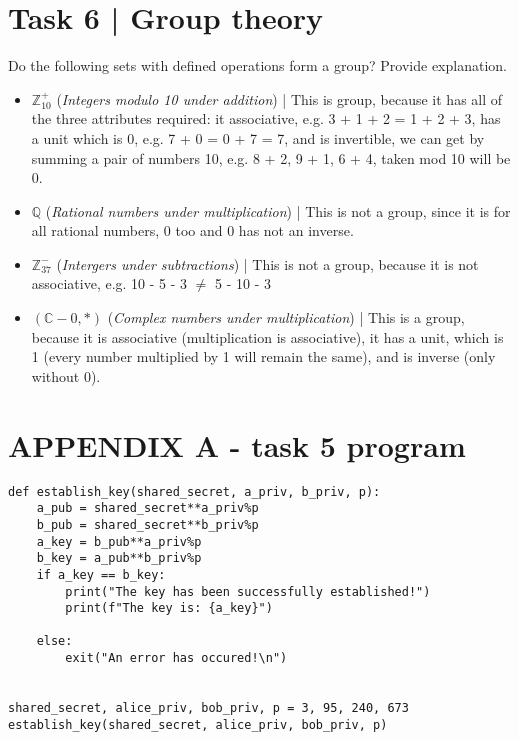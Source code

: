 \documentclass{article}
\begin{document}
\section*{Task 6 | Group theory}
Do the following sets with defined operations form a group? Provide explanation.
\begin{itemize}
    \item $\mathbb{Z}_{10}^+$ (\textit{Integers modulo 10 under addition}) | 
        This is group, because it has all of the three attributes required: it associative, 
        e.g. 3 + 1 + 2 =  1 + 2 + 3, has a unit which is 0, e.g. 7 + 0 = 0 + 7 = 7, and
        is invertible, we can get by summing a pair of numbers 10, e.g. 8 + 2, 9 + 1, 6 + 4,
        taken mod 10 will be 0.
    \item $\mathbb{Q}$ (\textit{Rational numbers under multiplication}) | This is not a group, 
        since it is for all rational numbers, 0 too and 0 has not an inverse.
    \item $\mathbb{Z}_{37}^-$ (\textit{Intergers under subtractions}) | This is not a group, because
        it is not associative, e.g. 10 - 5 - 3 $\ne$ 5 - 10 - 3
    \item $(\mathbb{C} - 0, *)$ (\textit{Complex numbers under multiplication}) | This is a group, 
        because it is associative (multiplication is associative), it has a unit, 
        which is 1 (every number multiplied by 1 will remain the same), and 
        is inverse (only without 0).
\end{itemize}


\pagebreak


\section*{APPENDIX A - task 5 program}
\begin{lstlisting}
def establish_key(shared_secret, a_priv, b_priv, p):
    a_pub = shared_secret**a_priv%p
    b_pub = shared_secret**b_priv%p
    a_key = b_pub**a_priv%p
    b_key = a_pub**b_priv%p
    if a_key == b_key:
        print("The key has been successfully established!")
        print(f"The key is: {a_key}")

    else:
        exit("An error has occured!\n")


shared_secret, alice_priv, bob_priv, p = 3, 95, 240, 673
establish_key(shared_secret, alice_priv, bob_priv, p)
\end{lstlisting}
\end{document}
